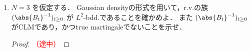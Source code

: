 \documentclass{jsarticle}
\begin{document}
\begin{enumerate}
\begin{proof}
        4.の結果より $\abs{B}^{2-N}$ は非負CLMなので，Prop. 4.7(i)より$\abs{B}^{2-N}$ は非負supermartingale.
        ゆえに任意の $t\ge0$ に対し
        $$
        E[\abs{B_t}^{2-N}]
        \le E[\abs{B_0}^{2-N}]
        = \abs{x}^{2-N}
        $$
        が成り立つので，$\abs{B}^{2-N}$ は $L^1$-bdd.
        よってThm. 3.19より $\abs{B_{\infty}}^{2-N}$ がa.s.で存在する．
    \end{proof}
    
    \item
    $N=3$ を仮定する．
    Gaussian densityの形式を用いて，r.v.の族 $(\abs{B_t}^{-1})_{t\ge0}$ が $L^2$-bdd.であることを確かめよ．
    また $(\abs{B_t}^{-1})_{t\ge0}$ がCLMであり，かつtrue martingaleでないことを示せ．
    \begin{proof}\textcolor{red}{（途中）}
        
    \end{proof}
\end{enumerate}
\end{document}
